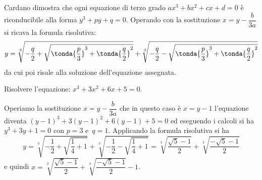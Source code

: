 Cardano dimostra che ogni equazione di terzo grado \(ax^3+bx^2+cx+d=0\) è 
riconducibile alla forma \(y^3+{py}+q=0\). Operando con la sostituzione 
\(x=y-\dfrac 
b{3a}\) si ricava la formula risolutiva: 
\[y=\sqrt[3]{-\dfrac q 2+\sqrt{\tonda{\dfrac p 3}^3+\tonda{\dfrac q 
2}^2}}+\sqrt[3]{-\dfrac q 2-\sqrt{\tonda{\dfrac p 
3}^3+\tonda{\dfrac 
q 
2}^2}}\] 
da cui poi risale alla soluzione dell'equazione assegnata.
\begin{esempio}
Risolvere l'equazione: \(x^3+3x^2+6x+5=0\).

Operiamo la sostituzione \(x=y-\dfrac b{3a}\) che in questo caso è \(x=y-1\) 
l'equazione diventa \((y-1)^3+3(y-1)^2+6(y-1)+5=0\) ed eseguendo i calcoli si 
ha 
\(y^3+3y+1=0\) con \(p=3\) e~\(q=1\).
Applicando la formula risolutiva si ha 
\[y=\sqrt[3]{-\dfrac 1 2+\sqrt{\dfrac 1 4+1}}+\sqrt[3]{-\dfrac 1 2-\sqrt{\dfrac 
1 
4+1}}=\sqrt[3]{\dfrac{\sqrt 5-1} 2}+\sqrt[3]{\dfrac{-\sqrt 5-1} 2}\] 
e quindi \(x=\sqrt[3]{\dfrac{\sqrt 5-1} 2}+\sqrt[3]{\dfrac{-\sqrt 5-1} 2}-1\).
\end{esempio}

